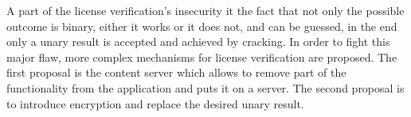 A part of the license verification's insecurity it the fact that not only the possible outcome is binary, either it works or it does not, and can be guessed, in the end only a unary result is accepted and achieved by cracking.
In order to fight this major flaw, more complex mechanisms for license verification are proposed.
The first proposal is the content server which allows to remove part of the functionality from the application and puts it on a server.
The second proposal is to introduce encryption and replace the desired unary result.
